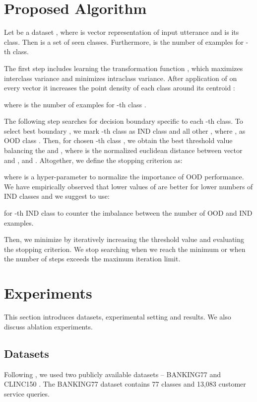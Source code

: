 \documentclass[runningheads]{llncs}
\begin{document}
\section{Proposed Algorithm}

Let  be a dataset , where  is vector representation of input utterance and  is its class. Then  is a set of seen classes. Furthermore,  is the number of examples for -th class. 



The first step includes learning the transformation function , which maximizes interclass variance and minimizes intraclass variance. After application of  on every  vector it increases the point density of each class  around its centroid :

 

where  is the number of examples for -th class . 

The following step searches for decision boundary  specific to each -th class. To select best boundary , we mark -th class  as IND class  and all other , where , as OOD class . Then, for chosen -th class , we obtain the best threshold value  balancing the  and , where  is the normalized euclidean distance between vector  and ,  and . Altogether, we define the stopping criterion  as:

where  is a hyper-parameter to normalize the importance of OOD performance. We have empirically observed that lower values of  are better for lower numbers of IND classes and we suggest to use:



for -th IND class  to counter the imbalance between the number of OOD and IND examples.



Then, we minimize  by iteratively increasing the threshold value  and evaluating the stopping criterion. We stop searching when we reach the minimum or when the number of steps exceeds the maximum iteration limit.









\section{Experiments}

This section introduces datasets, experimental setting and results. We also discuss ablation experiments.

\subsection{Datasets}
Following \cite{zhang2021adaptive_decision_boundary}, we used two publicly available datasets -- BANKING77 \cite{Casanueva2020_banking77} and CLINC150 \cite{larson2019evaluation_clinc_dataset}. The BANKING77 dataset contains 77 classes and 13,083 customer service queries.
\end{document}
